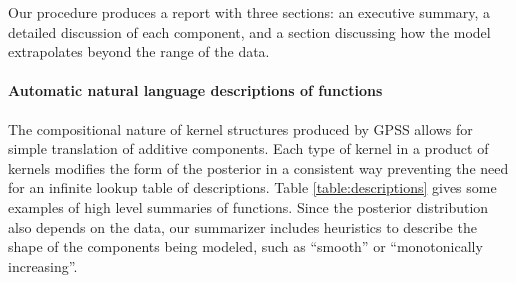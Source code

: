 \documentclass{article} %
\begin{document}



Our procedure produces a report with three sections: an executive summary, a detailed discussion of each component, and a section discussing how the model extrapolates beyond the range of the data.


\paragraph{Automatic natural language descriptions of functions}
%
The compositional nature of kernel structures produced by GPSS allows for simple translation of additive components.
Each type of kernel in a product of kernels modifies the form of the posterior in a consistent way preventing the need for an infinite lookup table of descriptions.
Table \ref{table:descriptions} gives some examples of high level summaries of functions.
Since the posterior distribution also depends on the data, our summarizer includes heuristics to describe the shape of the components being modeled, such as ``smooth'' or ``monotonically increasing''.
\end{document}
